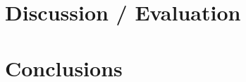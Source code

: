 \documentclass{article}
\begin{document}
\section{Discussion / Evaluation}



\section{Conclusions}


\printbibliography
\end{document}
